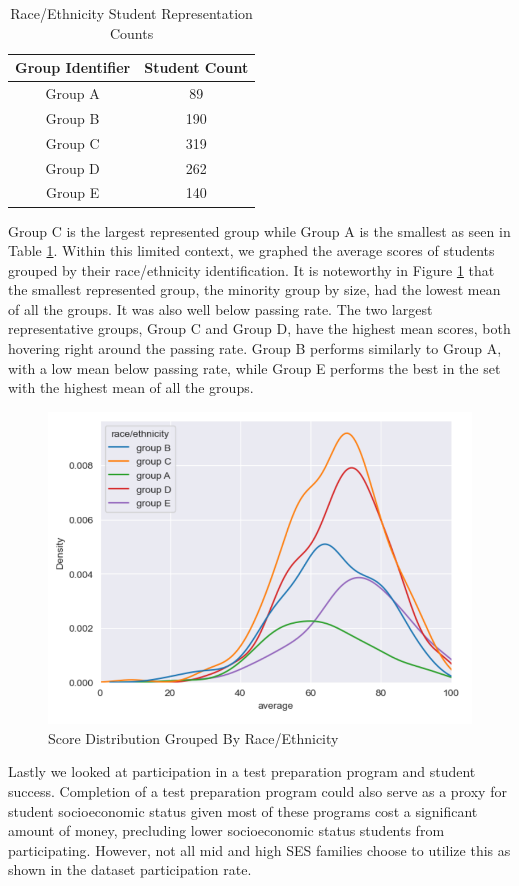\documentclass[man,floatsintext]{apa6} %
\begin{document}
\begin{table}[H]
    \centering
    \begin{tabular}{|c|c|}
    \hline
         Group Identifier & Student Count\\
         \hline\hline
         Group A & 89\\
         \hline
         Group B & 190\\
         \hline
         Group C & 319\\
         \hline
         Group D & 262\\
         \hline
         Group E & 140\\
         \hline
    \end{tabular}
    \caption{Race/Ethnicity Student Representation Counts}
    \label{tab:RaceCount}
\end{table}
Group C is the largest represented group while Group A is the smallest as seen in Table \ref{tab:RaceCount}. Within this limited context, we graphed the average scores of students grouped by their race/ethnicity identification. It is noteworthy in Figure \ref{fig:RaceScores} that the smallest represented group, the minority group by size, had the lowest mean of all the groups. It was also well below passing rate.  The two largest representative groups, Group C and Group D, have the highest mean scores, both hovering right around the passing rate. Group B performs similarly to Group A, with a low mean below passing rate, while Group E performs the best in the set with the highest mean of all the groups.
\begin{figure}[H]
    \centering
    \includegraphics[width=0.5\linewidth]{RaceScoreDistribution.png}
    \caption{Score Distribution Grouped By Race/Ethnicity}
    \label{fig:RaceScores}
\end{figure}
Lastly we looked at participation in a test preparation program and student success.  Completion of a test preparation program could also serve as a proxy for student socioeconomic status given most of these programs cost a significant amount of money, precluding lower socioeconomic status students from participating. However, not all mid and high SES families choose to utilize this as shown in the dataset participation rate.
\end{document}
